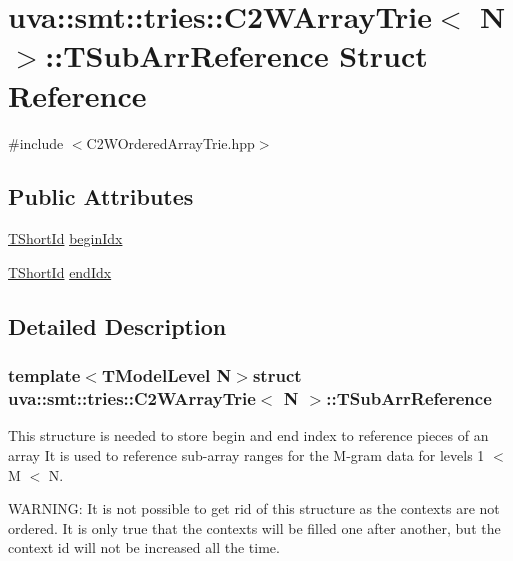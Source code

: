 \hypertarget{structuva_1_1smt_1_1tries_1_1_c2_w_array_trie_1_1_t_sub_arr_reference}{}\section{uva\+:\+:smt\+:\+:tries\+:\+:C2\+W\+Array\+Trie$<$ N $>$\+:\+:T\+Sub\+Arr\+Reference Struct Reference}
\label{structuva_1_1smt_1_1tries_1_1_c2_w_array_trie_1_1_t_sub_arr_reference}


{\ttfamily \#include $<$C2\+W\+Ordered\+Array\+Trie.\+hpp$>$}

\subsection*{Public Attributes}
\begin{DoxyCompactItemize}
\item 
\hyperlink{namespaceuva_1_1smt_1_1hashing_adcf22e1982ad09d3a63494c006267469}{T\+Short\+Id} \hyperlink{structuva_1_1smt_1_1tries_1_1_c2_w_array_trie_1_1_t_sub_arr_reference_a7ac947b9ce9220d6115209629a1bda0e}{begin\+Idx}
\item 
\hyperlink{namespaceuva_1_1smt_1_1hashing_adcf22e1982ad09d3a63494c006267469}{T\+Short\+Id} \hyperlink{structuva_1_1smt_1_1tries_1_1_c2_w_array_trie_1_1_t_sub_arr_reference_ae971b9041d86dee35237947786b8fef1}{end\+Idx}
\end{DoxyCompactItemize}


\subsection{Detailed Description}
\subsubsection*{template$<$T\+Model\+Level N$>$struct uva\+::smt\+::tries\+::\+C2\+W\+Array\+Trie$<$ N $>$\+::\+T\+Sub\+Arr\+Reference}

This structure is needed to store begin and end index to reference pieces of an array It is used to reference sub-\/array ranges for the M-\/gram data for levels 1 $<$ M $<$ N.

W\+A\+R\+N\+I\+N\+G\+: It is not possible to get rid of this structure as the contexts are not ordered. It is only true that the contexts will be filled one after another, but the context id will not be increased all the time.


